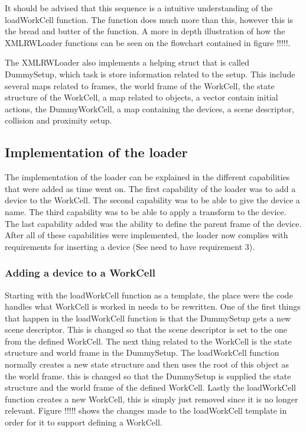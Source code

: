 It should be advised that this sequence is a intuitive understanding of the loadWorkCell function. The function does much more than this, however this is the bread and butter of the function. A more in depth illustration of how the XMLRWLoader functions can be seen on the flowchart contained in figure !!!!!.

The XMLRWLoader also implements a helping struct that is called DummySetup, which task is store information related to the setup. This include several maps related to frames, the world frame of the WorkCell, the state structure of the WorkCell, a map related to objects, a vector contain initial actions, the DummyWorkCell, a map containing the devices, a scene descriptor, collision and proximity setup.

\subsection{Implementation of the loader}
The implementation of the loader can be explained in the different capabilities that were added as time went on. The first capability of the loader was to add a device to the WorkCell. The second capability was to be able to give the device a name. The third capability was to be able to apply a transform to the device. The last capability added was the ability to define the parent frame of the device. After all of these capabilities were implemented, the loader now complies with requirements for inserting a device (See need to have requirement 3).

\subsubsection{Adding a device to a WorkCell}
Starting with the loadWorkCell function as a template, the place were the code handles what WorkCell is worked in needs to be rewritten. One of the first things that happen in the loadWorkCell function is that the DummySetup gets a new scene descriptor. This is changed so that the scene descriptor is set to the one from the defined WorkCell. The next thing related to the WorkCell is the state structure and world frame in the DummySetup. The loadWorkCell function normally creates a new state structure and then uses the root of this object as the world frame. this is changed so that the DummySetup is supplied the state structure and the world frame of the defined WorkCell. Lastly the loadWorkCell function creates a new WorkCell, this is simply just removed since it is no longer relevant. Figure !!!!! shows the changes made to the loadWorkCell template in order for it to support defining a WorkCell.

